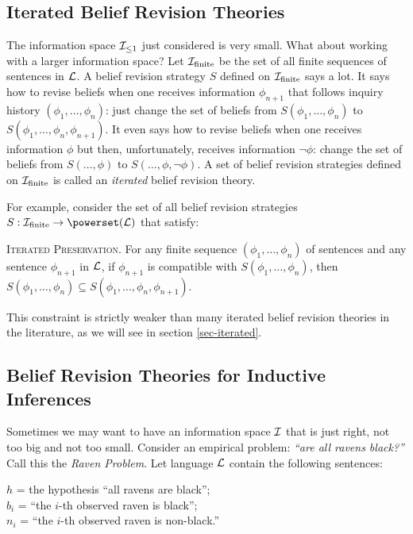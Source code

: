 \subsection{Iterated Belief Revision Theories}

The information space ${\cal I}_{\leq 1}$ just considered is very small. What about working with a larger information space? Let ${\cal I}_{\textrm{finite}}$ be the set of all finite sequences of sentences in ${\cal L}$. A belief revision strategy $S$ defined on ${\cal I}_{\textrm{finite}}$ says a lot. It says how to revise beliefs when one receives information $\phi_{n+1}$ that follows inquiry history $(\phi_1, \ldots, \phi_{n})$: just change the set of beliefs from $S(\phi_1, \ldots, \phi_{n})$ to $S(\phi_1, \ldots, \phi_{n}, \phi_{n+1})$. It even says how to revise beliefs when one receives information $\phi$ but then, unfortunately, receives information $\neg\phi$: change the set of beliefs from $S(\ldots, \phi)$ to $S(\ldots, \phi, \neg\phi)$. A set of belief revision strategies defined on ${\cal I}_{\textrm{finite}}$ is called an {\em iterated} belief revision theory. 

For example, consider the set of all belief revision strategies $S: {\cal I}_{\textrm{finite}} \to \powerset({\cal L)}$ that satisfy: \op

	\xm \textsc{Iterated Preservation.} For any finite sequence $(\phi_1, \ldots, \phi_{n})$ of sentences and any sentence $\phi_{n+1}$ in ${\cal L}$, if $\phi_{n+1}$ is compatible with $S(\phi_1, \ldots, \phi_{n})$, then $S(\phi_1, \ldots, \phi_{n}) \subseteq S(\phi_1, \ldots, \phi_{n}, \phi_{n+1})$.

\ed This constraint is strictly weaker than many iterated belief revision theories in the literature, as we will see in section \ref{sec-iterated}.




\subsection{Belief Revision Theories for Inductive Inferences}\label{sec-raven}
 
Sometimes we may want to have an information space $\cal I$ that is just right, not too big and not too small. Consider an empirical problem: {\em ``are all ravens black?''} Call this the {\em Raven Problem}. Let language ${\cal L}$ contain the following sentences: \op

		\xm $h$ = the hypothesis ``all ravens are black''; 
		\\ $b_{i}$ = ``the $i$-th observed raven is black'';
		\\ $n_{i}$ = ``the $i$-th observed raven is non-black.''

